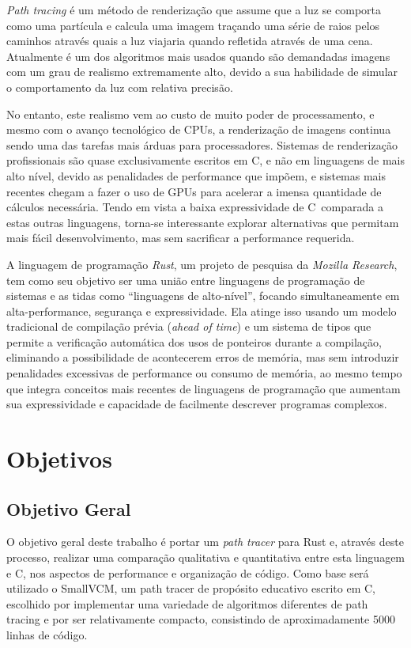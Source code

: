 \documentclass[12pt]{article}
\def\Cpp{{C\nolinebreak[4]\raisebox{.20ex}{\small\bf++}}}
\begin{document}
\emph{Path tracing} é um método de renderização que assume que a luz se comporta como uma partícula
e calcula uma imagem traçando uma série de raios pelos caminhos através quais a luz viajaria quando
refletida através de uma cena. Atualmente é um dos algoritmos mais usados quando são demandadas
imagens com um grau de realismo extremamente alto, devido a sua habilidade de simular o comportamento
da luz com relativa precisão.

No entanto, este realismo vem ao custo de muito poder de processamento, e mesmo com o avanço
tecnológico de CPUs, a renderização de imagens continua sendo uma das tarefas mais árduas para
processadores. Sistemas de renderização profissionais são quase exclusivamente escritos em \Cpp, e
não em linguagens de mais alto nível, devido as penalidades de performance que impõem, e sistemas
mais recentes chegam a fazer o uso de GPUs para acelerar a imensa quantidade de cálculos necessária.
Tendo em vista a baixa expressividade de \Cpp\ comparada a estas outras linguagens, torna-se
interessante explorar alternativas que permitam mais fácil desenvolvimento, mas sem sacrificar a
performance requerida.

A linguagem de programação \emph{Rust}, um projeto de pesquisa da \emph{Mozilla Research}, tem como
seu objetivo ser uma união entre linguagens de programação de sistemas e as tidas como ``linguagens
de alto-nível'', focando simultaneamente em alta-performance, segurança e expressividade. Ela atinge
isso usando um modelo tradicional de compilação prévia (\emph{ahead of time}) e um sistema de tipos
que permite a verificação automática dos usos de ponteiros durante a compilação, eliminando a
possibilidade de acontecerem erros de memória, mas sem introduzir penalidades excessivas de
performance ou consumo de memória, ao mesmo tempo que integra conceitos mais recentes de linguagens
de programação que aumentam sua expressividade e capacidade de facilmente descrever programas
complexos.

\section{Objetivos}

\subsection{Objetivo Geral}

O objetivo geral deste trabalho é portar um \emph{path tracer} para Rust e, através deste processo,
realizar uma comparação qualitativa e quantitativa entre esta linguagem e \Cpp, nos aspectos de
performance e organização de código. Como base será utilizado o
SmallVCM\citep{smallvcm}, um path tracer de propósito educativo escrito em
\Cpp, escolhido por implementar uma variedade de algoritmos diferentes de path tracing e por ser
relativamente compacto, consistindo de aproximadamente 5000 linhas de código.
\end{document}
